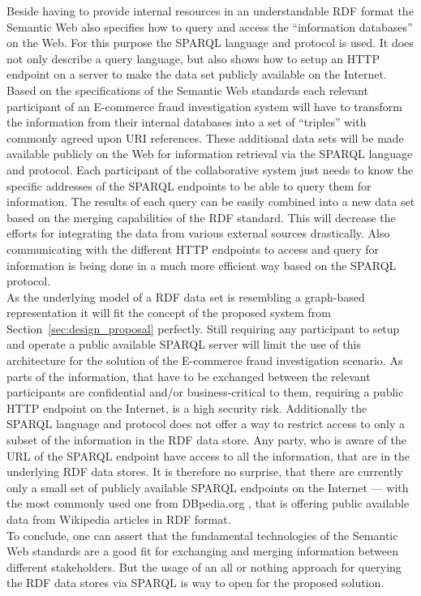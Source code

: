 Beside having to provide internal resources in an understandable \gls{RDF} format the Semantic Web also specifies how to query and access the ``information databases'' on the Web. For this purpose the \gls{SPARQL} language and protocol is used. It does not only describe a query language, but also shows how to setup an \gls{HTTP} endpoint on a server to make the data set publicly available on the Internet. \\

Based on the specifications of the Semantic Web standards each relevant participant of an \gls{E-commerce} fraud investigation system will have to transform the information from their internal databases into a set of ``triples'' with commonly agreed upon \gls{URI} references. These additional data sets will be made available publicly on the Web for information retrieval via the \gls{SPARQL} language and protocol. Each participant of the collaborative system just needs to know the specific addresses of the \gls{SPARQL} endpoints to be able to query them for information. The results of each query can be easily combined into a new data set based on the merging capabilities of the \gls{RDF} standard. This will decrease the efforts for integrating the data from various external sources drastically. Also communicating with the different \gls{HTTP} endpoints to access and query for information is being done in a much more efficient way based on the \gls{SPARQL} protocol. \\

As the underlying model of a \gls{RDF} data set is resembling a graph-based representation it will fit the concept of the proposed system from Section~\ref{sec:design_proposal} perfectly. Still requiring any participant to setup and operate a public available \gls{SPARQL} server will limit the use of this architecture for the solution of the \gls{E-commerce} fraud investigation scenario. As parts of the information, that have to be exchanged between the relevant participants are confidential and/or business-critical to them, requiring a public \gls{HTTP} endpoint on the Internet, is a high security risk. Additionally the \gls{SPARQL} language and protocol does not offer a way to restrict access to only a subset of the information in the \gls{RDF} data store. Any party, who is aware of the \gls{URL} of the \gls{SPARQL} endpoint have access to all the information, that are in the underlying \gls{RDF} data stores. It is therefore no surprise, that there are currently only a small set of publicly available \gls{SPARQL} endpoints on the Internet --- with the most commonly used one from DBpedia.org \citep{dbPedia.org}, that is offering public available data from Wikipedia articles in \gls{RDF} format. \\

To conclude, one can assert that the fundamental technologies of the Semantic Web standards are a good fit for exchanging and merging information between different stakeholders. But the usage of an all or nothing approach for querying the \gls{RDF} data stores via \gls{SPARQL} is way to open for the proposed solution.


